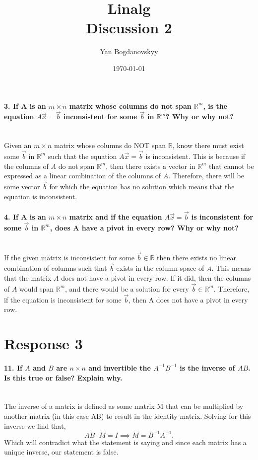 \documentclass{report}
\title{\Huge{Linalg}\\ Discussion 2}
\author{\huge{Yan Bogdanovskyy}}
\date{\today}
\begin{document}
\maketitle
\newpage%

\paragraph{3. If A is an $ m\times n  $ matrix whose columns do not span $ \mathbb{R}^{ m } $, is the equation $ A \vec{ x }= \vec{ b } $ inconsistent for some $ \vec{ b } $ in $ \mathbb{R}^{ m } $? Why or why not? \\ \\}
Given an $ m \times n $ matrix whose columns do NOT span $\mathbb{R} $, know there must exist some $ \vec{ b} $ in $ \mathbb{R}^{ m } $ such that the equation $ A \vec{ x } = \vec{ b } $ is inconsistent. This is because if the columns of $ A $ do not span $ \mathbb{R}^{ m } $, then there exists a vector in $ \mathbb{R}^{ m } $ that cannot be expressed as a linear combination of the columns of $ A $. Therefore, there will be some vector $ \vec{ b} $ for which the equation has no solution which means that the equation is inconsistent.
\paragraph{4. If A is an $ m \times n $ matrix and if the equation $ A \vec{ x } = \vec{ b } $ is inconsistent for some $ \vec{ b } $ in $ \mathbb{R}^{ m } $, does A have a pivot in every row? Why or why not? \\ \\}
If the given matrix is inconsistent for some $ \vec{ b } \in \mathbb{R}$ then there exists no linear combination of columns such that $ \vec{ b } $ exists in the column space of $ A $. This means that the matrix $ A $ does not have a pivot in every row. If it did, then the columns of $ A $ would span $ \mathbb{R}^{ m } $, and there would be a solution for every $ \vec{ b} \in \mathbb{R}^{ m }$. Therefore, if the equation is inconsistent for some $ \vec{ b} $, then A does not have a pivot in every row.
\section{Response 3}%
\label{sec: Response 3 }

\paragraph{11. If $ A $ and $ B $ are $ n \times n $ and invertible the $ A^{ -1 }B^{ -1 } $ is the inverse of $ AB $. Is this true or false? Explain why. \\ \\}
The inverse of a matrix is defined as some matrix M that can be multiplied by another matrix (in this case AB) to result in the identity matrix. Solving for this inverse we find that,
\[
AB \cdot M = I \implies M = B^{ -1 }A^{ -1 }
.\] 
Which will contradict what the statement is saying and since each matrix has a unique inverse, our statement is false. \\
\end{document}

